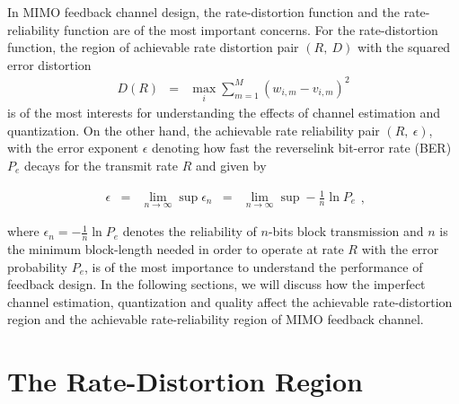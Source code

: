 \documentclass[10pt,fleqn, twocolumn]{IEEEtran}
\begin{document}
In MIMO feedback channel design, the rate-distortion function and
the rate-reliability function are of the most important concerns.
For the rate-distortion function, the region of achievable rate
distortion pair $\left(R,\ D\right)$ with the squared error
distortion
\begin{equation}
\begin{array}{rcl}
D\left(R\right)&=&\max\limits_{i}\sum\limits_{m=1}^{M}\left(w_{i,m}-v_{i,m}\right)^2
\end{array}\label{squared_error_distortion}
\end{equation}
\noindent is of the most interests for understanding the effects
of channel estimation and quantization. On the other hand, the
achievable rate reliability pair $\left(R,\ \epsilon\right)$, with
the error exponent $\epsilon$ denoting how fast the reverselink
bit-error rate (BER) $P_{e}$ decays for the transmit rate $R$ and
given by

\begin{equation}
\begin{array}{rcccl}
\epsilon&=&\lim\limits_{n\rightarrow\infty}\sup
\epsilon_{n}&=&\lim\limits_{n\rightarrow\infty}\sup-\frac{1}{n}\ln
P_{e}
\end{array},
\end{equation}

\noindent where $\epsilon_{n}=-\frac{1}{n}\ln P_{e}$ denotes the
reliability of $n$-bits block transmission and $n$ is the minimum
block-length needed in order to operate at rate $R$ with the error
probability $P_{e}$, is of the most importance to understand the
performance of feedback design. In the following sections, we will
discuss how the imperfect channel estimation, quantization and
quality affect the achievable rate-distortion region and the
achievable rate-reliability region of MIMO feedback channel.

\section{The Rate-Distortion Region}
\end{document}
